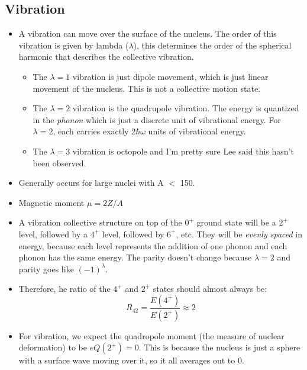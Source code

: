 \documentclass[letter]{article}
\begin{document}
\subsection{Vibration}
\begin{itemize}
\item A vibration can move over the surface of the nucleus. The order
  of this vibration is given by lambda ($\lambda$), this determines
  the order of the spherical harmonic that describes the collective vibration.
  \begin{itemize}
  \item The $\lambda=1$ vibration is just dipole movement, which
    is just linear movement of the nucleus. This is not a collective
    motion state.
  \item The $\lambda=2$ vibration is the quadrupole vibration. The
    energy is quantized in the \textit{phonon} which is just a
    discrete unit of vibrational energy. For $\lambda=2$, each carries
    exactly $2\hbar\omega$ units of vibrational energy.
  \item The $\lambda=3$ vibration is octopole and I'm pretty sure Lee
    said this hasn't been observed.
  \end{itemize}
\cite[Lec 13-16]{lecture}
\item Generally occurs for large nuclei with A $<$ 150.
\item Magnetic moment $\mu = 2Z/A$
\item A vibration collective structure on top of the $0^+$ ground
  state will be a $2^+$ level, followed by a $4^+$ level, followed by
  $6^+$, etc.  They will be
  \textit{evenly spaced} in energy, because each level represents the
  addition of one phonon and each phonon has the same energy. The
  parity doesn't change because $\lambda=2$ and parity goes like
  $(-1)^\lambda$.~\cite[Lec 13-16]{lecture}
\item Therefore, he ratio of the $4^+$ and $2^+$ states should almost always be:
  \begin{equation*}
    R_{42}=\frac{E(4^+)}{E(2^+)} \approx 2
  \end{equation*}
\item For vibration, we expect the quadropole moment (the measure of
  nuclear deformation) to be $eQ(2^+)=0$. This is because the nucleus
  is just a sphere with a surface wave moving over it, so it all
  averages out to 0.~\cite[Lec 13-16]{lecture}
  \begin{figure}[hbt]
    \centering
    \begin{tabular}{cc}

\end{tabular}
\end{figure}
\end{itemize}
\end{document}
